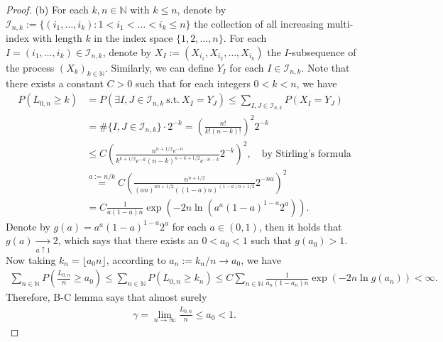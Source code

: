 \documentclass[12pt,a4paper]{amsart}
\theoremstyle{plain}
\theoremstyle{definition}
\theoremstyle{remark}
\numberwithin{equation}{section}
\begin{document}
\begin{proof}
(b) For each $k,n \in \mathbb N$ with $k\leq n$, denote by $\mathcal I_{n,k}:= \{ (i_1,\dots, i_k): 1< i_1<\dots < i_k \leq n \}$ the collection of all increasing multi-index with length $k$ in the index space $\{1,2,\dots,n\}$.
For each $I = (i_1,\dots, i_k) \in \mathcal I_{n,k}$, denote by
$X_I:= (X_{i_1},X_{i_2},\dots, X_{i_k})$ the $I$-subsequence of the process $(X_k)_{k\in \mathbb N}$.
Similarly, we can define $Y_I$ for each $I\in \mathcal I_{n,k}$. 
Note that there exists a constant $C>0$ such that for each integers $0 < k < n$, we have
\begin{align}
P\left( L_{0,n} \geq k \right)
&= P(\exists I,J\in \mathcal I_{n,k} ~\text{s.t.}~ X_I = Y_J)
\leq \sum_{I,J\in \mathcal I_{n,k}} P(X_I =Y_J)
\\&= \# \{I,J\in \mathcal I_{n,k}\}\cdot 2^{-k}
=\left(\frac{n!}{k!(n-k)!}\right)^2  2^{-k}
\\&\leq C \left( \frac{n^{n+1/2}e^{-n}}{k^{k+1/2}e^{-k} (n-k)^{n-k+1/2} e^{-{n-k}}} 2^{-k}\right)^2,\quad \text{by Stirling's formula}
\\& \overset{a:=n/k}{=} C \left( \frac{n^{n+1/2}}{(an)^{an+1/2} ((1-a)n)^{(1-a)n+1/2}} 2^{-na} \right)^2 
\\& = C \frac{1}{a(1-a)n}\exp \left( -2 n\ln \left ( a^a (1-a)^{1-a} 2^a\right)  \right).
\end{align}
Denote by $g(a) = a^a(1-a)^{1-a}2^a$ for each $a \in (0,1)$, then it holds that $g(a) \xrightarrow[a\uparrow 1]{} 2$, which says that there exists an $0<a_0 < 1$ such that $g(a_0) > 1$. 
Now taking $k_n = \lfloor a_0 n \rfloor$, according to $a_n:=k_n/n \to a_0$, we have
\begin{align}
\sum_{n \in \mathbb N} P\left( \frac{L_{0,n}}{n} \geq a_0 \right)
\leq \sum_{n\in \mathbb N} P\left(L_{0,n} \geq k_n \right)
\leq  C \sum_{n\in \mathbb N} \frac{1}{a_n(1-a_n)n}\exp \left( -2n \ln g(a_n) \right) < \infty.
\end{align}
Therefore, B-C lemma says that almost surely
\begin{align}
\gamma = \lim_{n\to \infty} \frac{L_{0,n}}{n} \leq a_0 < 1.
\end{align}
\end{proof}
\end{document}
